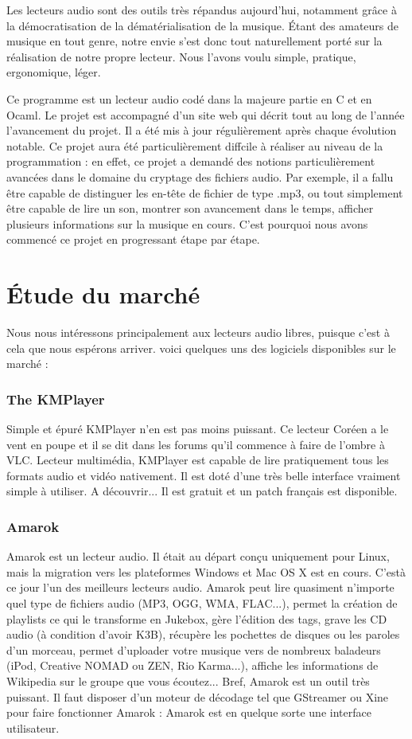 \documentclass[12pt,a4paper]{report}
\begin{document}
Les lecteurs audio sont des outils très répandus aujourd'hui, notamment grâce à la démocratisation de la dématérialisation de la musique. Étant des amateurs de musique en tout genre, notre envie s'est donc tout naturellement porté sur la réalisation de notre propre lecteur. Nous l'avons voulu simple, pratique, ergonomique, léger.

Ce programme est un lecteur audio codé dans la majeure partie en C et en Ocaml. Le projet est accompagné d'un site web qui décrit tout au long de l'année l'avancement du projet. Il a été mis à jour régulièrement après chaque évolution notable. Ce projet aura été particulièrement diffcile à réaliser au niveau de la programmation : en effet, ce projet a demandé des notions particulièrement avancées dans le domaine du cryptage des fichiers audio. Par exemple, il a fallu être capable de distinguer les en-tête de fichier de type .mp3, ou tout simplement être capable de lire un son, montrer son avancement dans le temps, afficher plusieurs informations sur la musique en cours. C'est pourquoi nous avons commencé ce projet en progressant étape par étape.

\section{Étude du marché}
Nous nous intéressons principalement aux lecteurs audio libres, puisque c'est à cela que nous espérons arriver. voici quelques uns des logiciels disponibles sur le marché :

\subsubsection{The KMPlayer}

Simple et épuré KMPlayer n'en est pas moins puissant. Ce lecteur Coréen a le vent en poupe et il se dit dans les forums qu'il commence à faire de l'ombre à VLC. Lecteur multimédia, KMPlayer est capable de lire pratiquement tous les formats audio et vidéo nativement. Il est doté d'une très belle interface vraiment simple à  utiliser. A découvrir... Il est gratuit et un patch français est disponible.

\subsubsection{Amarok}

Amarok est un lecteur audio. Il était au départ conçu uniquement pour Linux, mais la migration vers les plateformes Windows et Mac OS X est en cours. C'est\`a ce jour l'un des meilleurs lecteurs audio. 
Amarok peut lire quasiment n'importe quel type de fichiers audio (MP3, OGG, WMA, FLAC...), permet la création de playlists ce qui le transforme en Jukebox, gère l'édition des tags, grave les CD audio (à condition d'avoir K3B), récupère les pochettes de disques ou les paroles d'un morceau, permet d'uploader votre musique vers de nombreux baladeurs (iPod, Creative NOMAD ou ZEN, Rio Karma...), affiche les informations de Wikipedia sur le groupe que vous écoutez... Bref, Amarok est un outil très puissant.
Il faut disposer d'un moteur de décodage tel que GStreamer ou Xine pour faire fonctionner Amarok : Amarok est en quelque sorte une interface utilisateur. 
\end{document}

